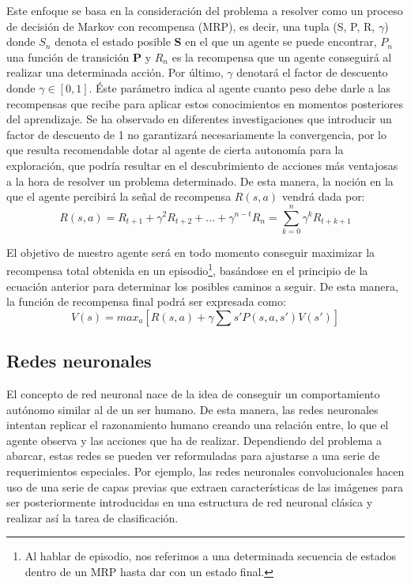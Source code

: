 \documentclass[11pt,spanish,listoffigures,listoftables]{tfgetsinf}
\begin{document}
Este enfoque se basa en la consideración del problema a resolver como un proceso de decisión de Markov con recompensa (MRP), es decir, una tupla (S, P, R, $\gamma$) donde $S_{n}$ denota el estado posible \textbf{S}  en el que un agente se puede encontrar, $P_{n}$ una función de transición \textbf{P} y $R_{n}$ es la recompensa que un agente conseguirá al realizar una determinada acción. Por último, $\gamma$ denotará el factor de descuento donde $\gamma \in [0,1]$. Éste parámetro indica al agente cuanto peso debe darle a las recompensas que recibe para aplicar estos conocimientos en momentos posteriores del aprendizaje. Se ha observado en diferentes investigaciones que introducir un factor de descuento de 1 no garantizará necesariamente la convergencia, por lo que resulta recomendable dotar al agente de cierta autonomía para la exploración, que podría resultar en el descubrimiento de acciones más ventajosas a la hora de resolver un problema determinado. De esta manera, la noción en la que el agente percibirá la señal de recompensa \textbf{$R(s,a)$} vendrá dada por:
\[R(s,a) = R_{t+1} + \gamma^{2}R_{t+2} + ... + \gamma^{n-t}R_{n} = \displaystyle\sum_{k=0}^{n} \gamma^{k} R_{t+k+1} \]

El objetivo de nuestro agente será en todo momento conseguir maximizar la recompensa total obtenida en un episodio\footnote{Al hablar de episodio, nos referimos a una determinada secuencia de estados dentro de un MRP hasta dar con un estado final.}, basándose en el principio de la ecuación anterior para determinar los posibles caminos a seguir. De esta manera, la función de recompensa final podrá ser expresada como:  \[V(s) = max_{a}[R(s,a) + \gamma \sum{s'}P(s,a,s') V(s')]\]



\subsection{Redes neuronales}

El concepto de red neuronal nace de la idea de conseguir un comportamiento autónomo similar al de un ser humano. De esta manera, las redes neuronales intentan replicar el razonamiento humano creando una relación entre, lo que el agente observa y las acciones que ha de realizar. Dependiendo del problema a abarcar, estas redes se pueden ver reformuladas para ajustarse a una serie de requerimientos especiales. Por ejemplo, las redes neuronales convolucionales hacen uso de una serie de capas previas que extraen características de las imágenes para ser posteriormente introducidas en una estructura de red neuronal clásica y realizar así la tarea de clasificación.
\end{document}
